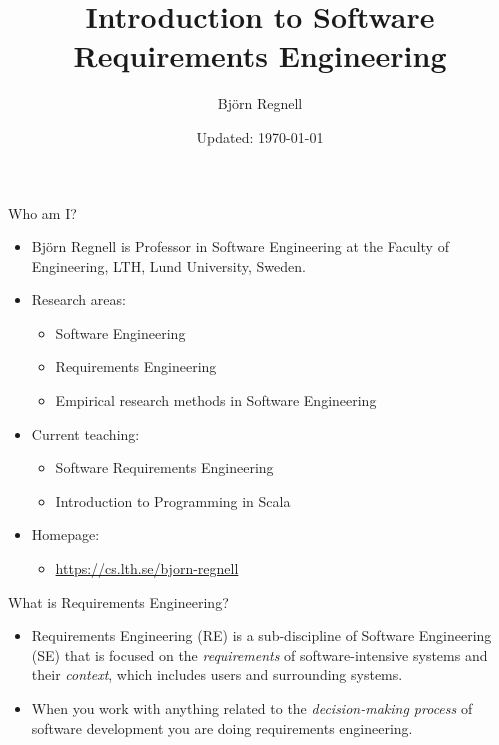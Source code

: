 \documentclass{beamer}
\author{Björn Regnell}
\title{Introduction to Software\\Requirements Engineering}
\date{\footnotesize Updated: \today}
\begin{document}
\maketitle

\begin{frame}[fragile]{Who am I?}
\begin{itemize}
\item Björn Regnell is Professor in Software Engineering at the Faculty of Engineering, LTH, Lund University, Sweden.
\item Research areas: 
\begin{itemize}
\item Software Engineering
\item Requirements Engineering 
\item Empirical research methods in Software Engineering 
\end{itemize}
\item Current teaching: 
\begin{itemize}
  \item Software Requirements Engineering
  \item Introduction to Programming in Scala 
\end{itemize}
\item Homepage: 
\begin{itemize}
\item \url{https://cs.lth.se/bjorn-regnell}
\end{itemize}
\end{itemize}
\end{frame}

\begin{frame}[fragile]{What is Requirements Engineering?}
\begin{itemize}
\item  Requirements Engineering (RE) is a sub-discipline of Software Engineering (SE) that is focused on the \textit{requirements} of software-intensive systems and their \textit{context}, which includes users and surrounding systems.
\item When you work with anything related to the \textit{decision-making process} of software development you are doing requirements engineering.
\end{itemize}
\end{frame}
\end{document}
